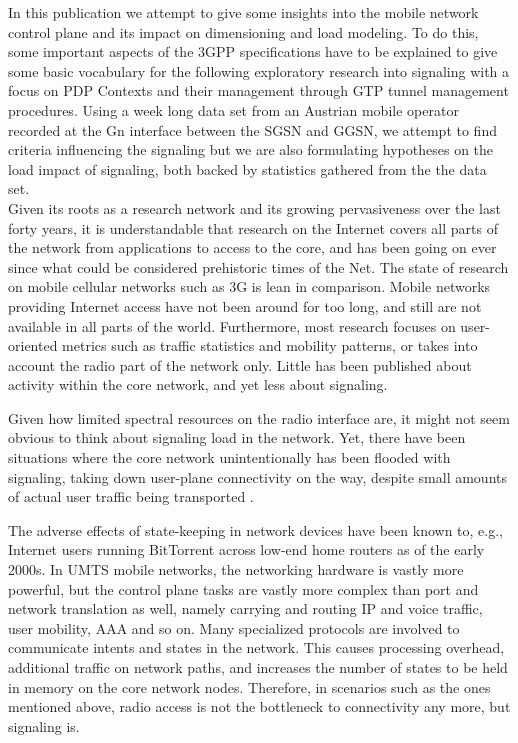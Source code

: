 In this publication we attempt to give some insights into the mobile network control plane and its impact on dimensioning and load modeling. To do this, some important aspects of the \gls{3GPP} specifications have to be explained to give some basic vocabulary for the following exploratory research into signaling with a focus on \gls{PDP} Contexts and their management through \gls{GTP} tunnel management procedures. Using a week long data set from an Austrian mobile operator recorded at the Gn interface between the \gls{SGSN} and \gls{GGSN}, we attempt to find criteria influencing the signaling but we are also formulating hypotheses on the load impact of signaling, both backed by statistics gathered from the the data set.\\




Given its roots as a research network and its growing pervasiveness over the last forty years, it is understandable that research on the Internet covers all parts of the network from applications to access to the core, and has been going on ever since what could be considered prehistoric times of the Net. The state of research on mobile cellular networks such as 3G is lean in comparison. Mobile networks providing Internet access have not been around for too long, and still are not available in all parts of the world. Furthermore, most research focuses on user-oriented metrics such as traffic statistics and mobility patterns, or takes into account the radio part of the network only. Little has been published about activity within the core network, and yet less about signaling.

Given how limited spectral resources on the radio interface are, it might not seem obvious to think about signaling load in the network. Yet, there have been situations where the core network unintentionally has been flooded with signaling, taking down user-plane connectivity on the way, despite small amounts of actual user traffic being transported \cite{lt2012docostorm, it2011birdandroid}. 

The adverse effects of state-keeping in network devices have been known to, e.g.,  Internet users running BitTorrent across low-end home routers as of the early 2000s. In \gls{UMTS} mobile networks, the networking hardware is vastly more powerful, but the control plane tasks are vastly more complex than port and network translation as well, namely carrying and routing IP and voice traffic, user mobility, \gls{AAA} and so on. Many specialized protocols are involved to communicate intents and states in the network. This causes processing overhead, additional traffic on network paths, and increases the number of states to be held in memory on the core network nodes. Therefore, in scenarios such as the ones mentioned above, radio access is not the bottleneck to connectivity any more, but signaling is.

